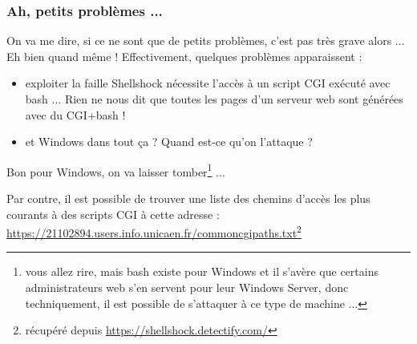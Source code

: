 \documentclass[]{projet-M1}
\begin{document}
\subsubsection{Ah, petits problèmes ...}
On va me dire, si ce ne sont que de petits problèmes, c'est pas très grave alors ... Eh bien quand même ! 
Effectivement, quelques problèmes apparaissent : 
\begin{itemize}
\item exploiter la \gls{faille} \gls{Shellshock} nécessite l'accès à un script \gls{CGI} exécuté avec \gls{bash} ... Rien ne nous dit que toutes les pages d'un serveur web sont générées avec du \gls{CGI}+\gls{bash} !
\item et Windows dans tout ça ? Quand est-ce qu'on l'attaque ?
\end{itemize}
Bon pour Windows, on va laisser tomber\footnote{vous allez rire, mais \gls{bash} existe pour Windows et il s'avère que certains administrateurs web s'en servent pour leur Windows Server, donc techniquement, il est possible de s'attaquer à ce type de machine ...} ... 

Par contre, il est possible de trouver une liste des chemins d'accès les plus courants à des scripts \gls{CGI} à cette adresse : \url{https://21102894.users.info.unicaen.fr/commoncgipaths.txt}\footnote{récupéré depuis \url{https://shellshock.detectify.com/}}
\end{document}

